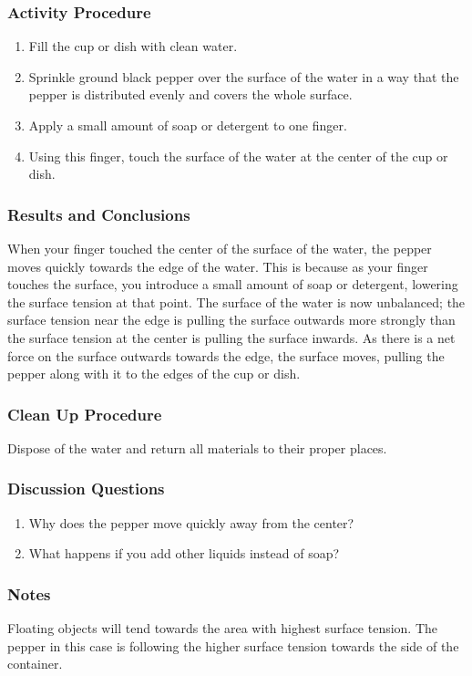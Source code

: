 \subsubsection*{Activity Procedure}
\begin{enumerate}
\item{Fill the cup or dish with clean water.}
\item{Sprinkle ground black pepper over the surface of the water in a way that the pepper is distributed evenly and covers the whole surface.}
\item{Apply a small amount of soap or detergent to one finger.}
\item{Using this finger, touch the surface of the water at the center of the cup or dish.}
\end{enumerate}
\subsubsection*{Results and Conclusions}
When your finger touched the center of the surface of the water, the pepper moves quickly towards the edge of the water. This is because as your finger touches the surface, you introduce a small amount of soap or detergent, lowering the surface tension at that point. The surface of the water is now unbalanced; the surface tension near the edge is pulling the surface outwards more strongly than the surface tension at the center is pulling the surface inwards. As there is a net force on the surface outwards towards the edge, the surface moves, pulling the pepper along with it to the edges of the cup or dish.

\subsubsection*{Clean Up Procedure}
Dispose of the water and return all materials to their proper places.

\subsubsection*{Discussion Questions}
\begin{enumerate}
\item{Why does the pepper move quickly away from the center?}
\item{What happens if you add other liquids instead of soap?}
\end{enumerate}

\subsubsection*{Notes}
Floating objects will tend towards the area with highest surface tension. The pepper in this case is following the higher surface tension towards the side of the container.

